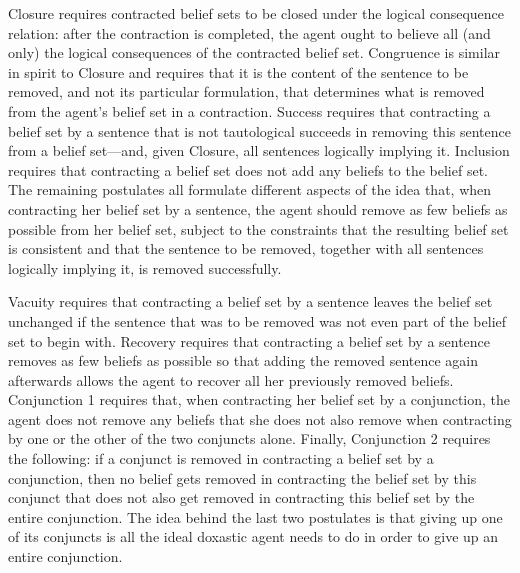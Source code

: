 Closure requires contracted belief sets to be closed under the logical consequence relation: after the contraction is completed, the agent ought to believe all (and only) the logical consequences of the contracted belief set. Congruence is similar in spirit to Closure and requires that it is the content of the sentence to be removed, and not its particular formulation, that determines what is removed from the agent's belief set in a contraction. Success requires that contracting a belief set by a sentence that is not tautological succeeds in removing this sentence from a belief set---and, given Closure, all sentences logically implying it. Inclusion requires that contracting a belief set does not add any beliefs to the belief set. The remaining postulates all formulate different aspects of the idea that, when contracting her belief set by a sentence, the agent should remove as few beliefs as possible from her belief set, subject to the constraints that the resulting belief set is consistent and that the sentence to be removed, together with all sentences logically implying it, is removed successfully.

Vacuity requires that contracting a belief set by a sentence leaves the belief set unchanged if the sentence that was to be removed was not even part of the belief set to begin with. %
Recovery requires that contracting a belief set by a sentence removes as few beliefs as possible so that adding the removed sentence again afterwards allows the agent to recover all her previously removed beliefs. Conjunction 1 requires that, when contracting her belief set by a conjunction, the agent does not remove any beliefs that she does not also remove when contracting by one or the other of the two conjuncts alone. Finally, Conjunction 2 requires the following: if a conjunct is removed in contracting a belief set by a conjunction, then no belief gets removed in contracting the belief set by this conjunct that does not also get removed in contracting this belief set by the entire conjunction. The idea behind the last two postulates is that giving up one of its conjuncts is all the ideal doxastic agent needs to do in order to give up an entire conjunction.


